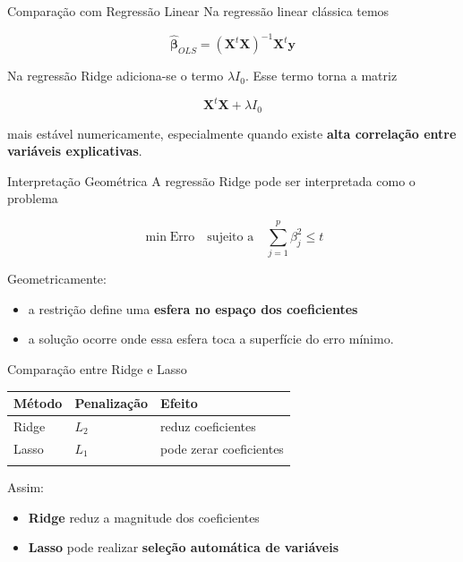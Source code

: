 \documentclass[
  ignorenonframetext,
  aspectratio=169,
]{beamer}
\providecommand{\tightlist}{%
  \setlength{\itemsep}{0pt}\setlength{\parskip}{0pt}}
\begin{document}
\begin{frame}
\begin{block}{Comparação com Regressão Linear}
\label{comparauxe7uxe3o-com-regressuxe3o-linear}
Na regressão linear clássica temos

\[
\hat{\boldsymbol{\beta}}_{OLS}
=
(\boldsymbol{X}^t \boldsymbol{X})^{-1} \boldsymbol{X}^t \boldsymbol{y}
\]

Na regressão Ridge adiciona-se o termo \(\lambda I_0\). Esse termo torna
a matriz

\[
\boldsymbol{X}^t \boldsymbol{X} + \lambda I_0
\]

mais estável numericamente, especialmente quando existe \textbf{alta
correlação entre variáveis explicativas}.
\end{block}
\end{frame}

\begin{frame}
\begin{block}{Interpretação Geométrica}
\label{interpretauxe7uxe3o-geomuxe9trica}
A regressão Ridge pode ser interpretada como o problema

\[
\min \text{Erro}
\quad
\text{sujeito a}
\quad
\sum_{j=1}^{p} \beta_j^2 \leq t
\]

Geometricamente:

\begin{itemize}
\tightlist
\item
  a restrição define uma \textbf{esfera no espaço dos coeficientes}
\item
  a solução ocorre onde essa esfera toca a superfície do erro mínimo.
\end{itemize}
\end{block}
\end{frame}

\begin{frame}
\begin{block}{Comparação entre Ridge e Lasso}
\label{comparauxe7uxe3o-entre-ridge-e-lasso}
\begin{longtable}[]{@{}lll@{}}
\toprule\noalign{}
Método & Penalização & Efeito \\
\midrule\noalign{}
\endhead
Ridge & \(L_2\) & reduz coeficientes \\
Lasso & \(L_1\) & pode zerar coeficientes \\
\bottomrule\noalign{}
\end{longtable}

Assim:

\begin{itemize}
\tightlist
\item
  \textbf{Ridge} reduz a magnitude dos coeficientes
\item
  \textbf{Lasso} pode realizar \textbf{seleção automática de variáveis}
\end{itemize}
\end{block}
\end{frame}
\end{document}
